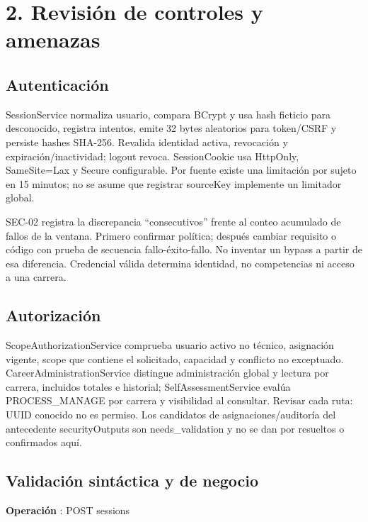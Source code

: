 \documentclass[12pt,a4paper]{report}
\begin{document}
\chapter{2. Revisión de controles y
amenazas}\label{ACD4-semana-4-2-revisiuxf3n-de-controles-y-amenazas}

\section{Autenticación}\label{ACD4-semana-4-autenticaciuxf3n}

SessionService normaliza usuario, compara BCrypt y usa hash ficticio
para desconocido, registra intentos, emite 32 bytes aleatorios para
token/CSRF y persiste hashes SHA-256. Revalida identidad activa,
revocación y expiración/inactividad; logout revoca. SessionCookie usa
HttpOnly, SameSite=Lax y Secure configurable. Por fuente existe una
limitación por sujeto en 15 minutos; no se asume que registrar sourceKey
implemente un limitador global.

SEC-02 registra la discrepancia ``consecutivos'' frente al conteo
acumulado de fallos de la ventana. Primero confirmar política; después
cambiar requisito o código con prueba de secuencia fallo-éxito-fallo. No
inventar un bypass a partir de esa diferencia. Credencial válida
determina identidad, no competencias ni acceso a una carrera.

\section{Autorización}\label{ACD4-semana-4-autorizaciuxf3n}

ScopeAuthorizationService comprueba usuario activo no técnico,
asignación vigente, scope que contiene el solicitado, capacidad y
conflicto no exceptuado. CareerAdministrationService distingue
administración global y lectura por carrera, incluidos totales e
historial; SelfAssessmentService evalúa PROCESS\_MANAGE por carrera y
visibilidad al consultar. Revisar cada ruta: UUID conocido no es
permiso. Los candidatos de asignaciones/auditoría del antecedente
securityOutputs son needs\_validation y no se dan por resueltos o
confirmados aquí.

\section{Validación sintáctica y de
negocio}\label{ACD4-semana-4-validaciuxf3n-sintuxe1ctica-y-de-negocio}

\textbf{Operación }: POST sessions
\end{document}
